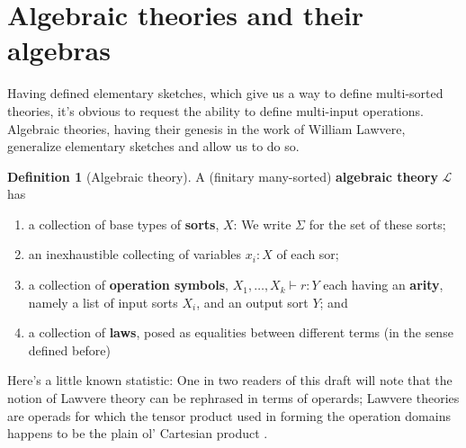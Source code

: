 \documentclass[12pt,twoside]{reedthesis}
\theoremstyle{definition}
\newtheorem{definition}{Definition}
\theoremstyle{remark}
\theoremstyle{plain}
\begin{document}
\section{Algebraic theories and their algebras}
Having defined elementary sketches, which give us a way to define multi-sorted
theories, it's obvious to request the ability to define multi-input operations.
Algebraic theories, having their genesis in the work of William Lawvere,
generalize elementary sketches and allow us to do so.
\begin{definition}[Algebraic theory]\label{def:alg theory}
  A (finitary many-sorted) \textbf{algebraic theory} $\mathcal{L}$ has
  \begin{enumerate}
    \item a collection of base types of \textbf{sorts}, $X$: We write $\Sigma$ for the set of these sorts;
    \item an inexhaustible collecting of variables $x_{i}:X$ of each sor;
    \item a collection of \textbf{operation symbols}, $X_{1},\dots , X_{k} \vdash r : Y$ each having an \textbf{arity}, namely a list of input sorts $X_{i}$, and an output sort $Y$; and
    \item a collection of \textbf{laws}, posed as equalities between different
          terms (in the sense defined before)
  \end{enumerate}
\end{definition}
Here's a little known statistic: One in two readers of this draft will note that
the notion of Lawvere theory can be rephrased in terms of operards; Lawvere
theories are operads for which the tensor product used in forming the operation
domains happens to be the plain ol' Cartesian product \cite{TODO: Nlab}.
\end{document}
